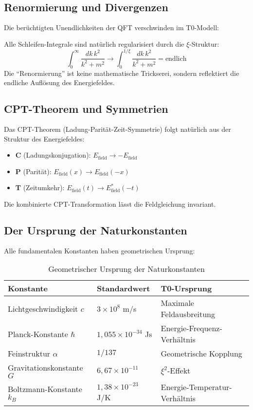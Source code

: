 \documentclass[12pt,a4paper]{article}
\newcommand{\xipar}{\ensuremath{\xi}}
\newcommand{\Efield}{E_\text{field}}
\begin{document}
	\subsection{Renormierung und Divergenzen}
	
	Die berüchtigten Unendlichkeiten der QFT verschwinden im T0-Modell:
	
	\begin{quantum}
		Alle Schleifen-Integrale sind natürlich regularisiert durch die $\xipar$-Struktur:
		\begin{equation}
			\int_0^\infty \frac{dk \, k^2}{k^2 + m^2} \rightarrow \int_0^{1/\xipar} \frac{dk \, k^2}{k^2 + m^2} = \text{endlich}
		\end{equation}
		Die ``Renormierung'' ist keine mathematische Trickserei, sondern reflektiert die endliche Auflösung des Energiefeldes.
	\end{quantum}
	
	\subsection{CPT-Theorem und Symmetrien}
	
	Das CPT-Theorem (Ladung-Parität-Zeit-Symmetrie) folgt natürlich aus der Struktur des Energiefeldes:
	
	\begin{itemize}
		\item \textbf{C} (Ladungskonjugation): $\Efield \rightarrow -\Efield$
		\item \textbf{P} (Parität): $\Efield(x) \rightarrow \Efield(-x)$
		\item \textbf{T} (Zeitumkehr): $\Efield(t) \rightarrow \Efield^*(-t)$
	\end{itemize}
	
	Die kombinierte CPT-Transformation lässt die Feldgleichung invariant.
	
	\subsection{Der Ursprung der Naturkonstanten}
	
	Alle fundamentalen Konstanten haben geometrischen Ursprung:
	
	\begin{table}[H]
		\centering
		\begin{tabular}{lll}
			\toprule
			\textbf{Konstante} & \textbf{Standardwert} & \textbf{T0-Ursprung} \\
			\midrule
			Lichtgeschwindigkeit $c$ & $3 \times 10^8$ m/s & Maximale Feldausbreitung \\
			Planck-Konstante $\hbar$ & $1,055 \times 10^{-34}$ Js & Energie-Frequenz-Verhältnis \\
			Feinstruktur $\alpha$ & $1/137$ & Geometrische Kopplung \\
			Gravitationskonstante $G$ & $6,67 \times 10^{-11}$ & $\xipar^2$-Effekt \\
			Boltzmann-Konstante $k_B$ & $1,38 \times 10^{-23}$ J/K & Energie-Temperatur-Verhältnis \\
			\bottomrule
		\end{tabular}
		\caption{Geometrischer Ursprung der Naturkonstanten}
	\end{table}
	
\end{document}
